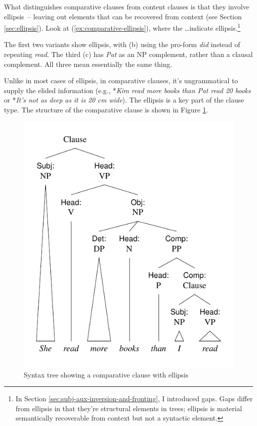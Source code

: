What distinguishes comparative clauses from content clauses is that they involve ellipsis~-- leaving out elements that can be recovered from context (see Section \ref{sec:ellipsis}). Look at (\ref{ex:comparative-ellipsis}), where the \dots indicate ellipsis.\footnote{In Section \ref{sec:subj-aux-inversion-and-fronting}, I introduced gaps. Gaps differ from ellipsis in that they're structural elements in trees; ellipsis is material semantically recoverable from context but not a syntactic element.}

\ea \label{ex:comparative-ellipsis}
    \z
\z
{}

The first two variants show ellipsis, with (b) using the pro-form \textit{did} instead of repeating \textit{read}. The third (c) has \textit{Pat} as an NP complement, rather than a clausal complement. All three mean essentially the same thing.

Unlike in most cases of ellipsis, in comparative clauses, it's ungrammatical to supply the elided information (e.g., *\textit{Kim read more books than Pat read 20 books} or *\textit{It's not as deep as it is 20 cm wide}). The ellipsis is a key part of the clause type. The structure of the comparative clause is shown in Figure \ref{fig:comp-tree}.

\begin{figure}
    \centering
    \includegraphics[width=0.7\linewidth]{figures/she read more books than I read.pdf}
    \caption{Syntax tree showing a comparative clause with ellipsis}\label{fig:comp-tree}
\end{figure}


